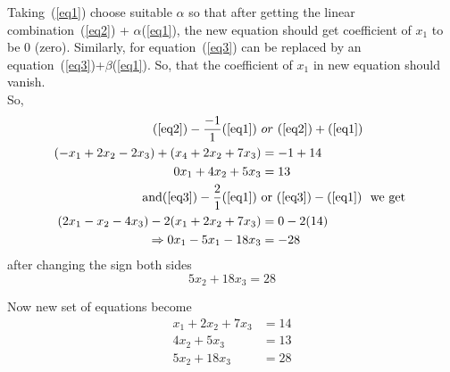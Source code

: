 \documentclass{article}
\begin{document}
Taking~(\ref{eq1}) choose suitable \(\alpha\) so that after getting the linear combination~(\ref{eq2}) + \(\alpha\)(\ref{eq1}), the new equation should get coefficient of \(x_1\) to be 0 (zero). Similarly, for equation~(\ref{eq3}) can be replaced by an equation~(\ref{eq3})+\(\beta\)(\ref{eq1}). So, that the coefficient of \(x_1\) in new equation should vanish.\\

So,
\begin{align}
    (\ref{eq2}) - \frac{-1}{1}(\ref{eq1}) ~ & or ~ (\ref{eq2}) + (\ref{eq1})\nonumber\\
    (-x_1 + 2x_2 - 2x_3) + (x_4 + 2x_2 + 7x_3) &= -1 + 14\nonumber\\
    0x_1 + 4x_2 + 5x_3 &= 13\nonumber\\
    \text{and} (\ref{eq3}) - \frac{2}{1}(\ref{eq1}) ~ & \text{or} ~ (\ref{eq3}) - (\ref{eq1}) ~\text{ we get } \nonumber\\
    (2x_1 - x_2 - 4x_3) - 2(x_1 + 2x_2 + 7x_3) &= 0 - 2(14) \nonumber\\
    \Rightarrow 0x_1 - 5x_1 - 18x_3 &= -28 \nonumber
\end{align}
after changing the sign both sides
\[
5x_2 + 18x_3 = 28
\]

Now new set of equations become 
\begin{align}
    x_1 + 2x_2 + 7x_3 &= 14 \label{equ1} \\
    4x_2 + 5x_3 &= 13 \label{equ2} \\
    5x_2 + 18x_3 &= 28 \label{equ3}
\end{align}
\end{document}
